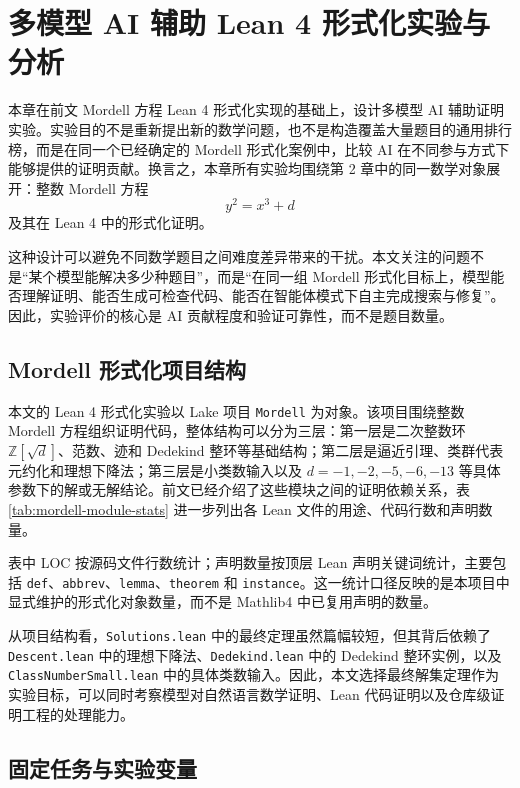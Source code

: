 \newpage
{}
\section{多模型 AI 辅助 Lean 4 形式化实验与分析}

本章在前文 Mordell 方程 Lean 4 形式化实现的基础上，设计多模型 AI 辅助证明实验。实验目的不是重新提出新的数学问题，也不是构造覆盖大量题目的通用排行榜，而是在同一个已经确定的 Mordell 形式化案例中，比较 AI 在不同参与方式下能够提供的证明贡献。换言之，本章所有实验均围绕第 2 章中的同一数学对象展开：整数 Mordell 方程
\[
  y^2=x^3+d
\]
及其在 Lean 4 中的形式化证明。

这种设计可以避免不同数学题目之间难度差异带来的干扰。本文关注的问题不是“某个模型能解决多少种题目”，而是“在同一组 Mordell 形式化目标上，模型能否理解证明、能否生成可检查代码、能否在智能体模式下自主完成搜索与修复”。因此，实验评价的核心是 AI 贡献程度和验证可靠性，而不是题目数量。

\subsection{Mordell 形式化项目结构}

本文的 Lean 4 形式化实验以 Lake 项目 \texttt{Mordell} 为对象。该项目围绕整数 Mordell 方程组织证明代码，整体结构可以分为三层：第一层是二次整数环 \(\mathbb Z[\sqrt d]\)、范数、迹和 Dedekind 整环等基础结构；第二层是逼近引理、类群代表元约化和理想下降法；第三层是小类数输入以及 \(d=-1,-2,-5,-6,-13\) 等具体参数下的解或无解结论。前文已经介绍了这些模块之间的证明依赖关系，表 \ref{tab:mordell-module-stats} 进一步列出各 Lean 文件的用途、代码行数和声明数量。

表中 LOC 按源码文件行数统计；声明数量按顶层 Lean 声明关键词统计，主要包括 \texttt{def}、\texttt{abbrev}、\texttt{lemma}、\texttt{theorem} 和 \texttt{instance}。这一统计口径反映的是本项目中显式维护的形式化对象数量，而不是 Mathlib4 中已复用声明的数量。



从项目结构看，\texttt{Solutions.lean} 中的最终定理虽然篇幅较短，但其背后依赖了 \texttt{Descent.lean} 中的理想下降法、\texttt{Dedekind.lean} 中的 Dedekind 整环实例，以及 \texttt{ClassNumberSmall.lean} 中的具体类数输入。因此，本文选择最终解集定理作为实验目标，可以同时考察模型对自然语言数学证明、Lean 代码证明以及仓库级证明工程的处理能力。

\subsection{固定任务与实验变量}

